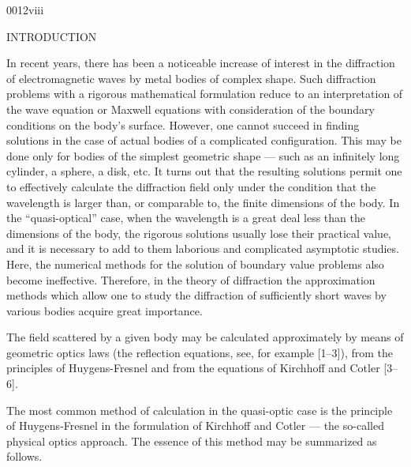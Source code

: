 \begin{scanpage}{0012}{viii}
\begin{center}INTRODUCTION\end{center}
In recent years, there has been a noticeable increase of interest in the diffraction of electromagnetic waves by metal bodies of complex shape. Such diffraction problems with a rigorous mathematical formulation reduce to an interpretation of the wave equation or Maxwell equations with consideration of the boundary conditions on the body's surface. However, one cannot succeed in finding solutions in the case of actual bodies of a complicated configuration. This may be done only for bodies of the simplest geometric shape --- such as an infinitely long cylinder, a sphere, a disk, etc. It turns out that the resulting solutions permit one to effectively calculate the diffraction field only under the condition that the wavelength is larger than, or comparable to, the finite dimensions of the body. In the ``quasi-optical'' case, when the wavelength is a great deal less than the dimensions of the body, the rigorous solutions usually lose their practical value, and it is necessary to add to them laborious and complicated asymptotic studies. Here, the numerical methods for the solution of boundary value problems also become ineffective. Therefore, in the theory of diffraction the approximation methods which allow one to study the diffraction of sufficiently short waves by various bodies acquire great importance.

The field scattered by a given body may be calculated approximately by means of geometric optics laws (the reflection equations, see, for example [1--3]), from the principles of Huygens-Fresnel and from the equations of Kirchhoff and Cotler [3--6].

The most common method of calculation in the quasi-optic case is the principle of Huygens-Fresnel in the formulation of Kirchhoff and Cotler --- the so-called physical optics approach. The essence of this method may be summarized as follows.
\end{scanpage}
